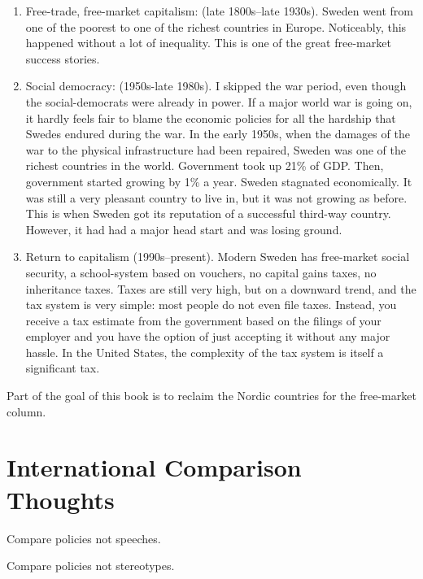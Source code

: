 \begin{enumerate}
\item Free-trade, free-market capitalism: (late 1800s--late 1930s). Sweden went
from one of the poorest to one of the richest countries in Europe. Noticeably,
this happened without a lot of inequality. This is one of the great free-market
success stories.
\item Social democracy: (1950s-late 1980s). I skipped the war period, even
though the social-democrats were already in power. If a major world war is
going on, it hardly feels fair to blame the economic policies for all the
hardship that Swedes endured during the war. In the early 1950s, when the
damages of the war to the physical infrastructure had been repaired, Sweden was
one of the richest countries in the world. Government took up 21\% of GDP.
Then, government started growing by 1\% a year. Sweden stagnated economically.
It was still a very pleasant country to live in,  but it was not growing as
before. This is when Sweden got its reputation of a successful third-way
country. However, it had had a major head start and was losing ground.
\item Return to capitalism (1990s--present). Modern Sweden has free-market
social security, a school-system based on vouchers, no capital gains taxes, no
inheritance taxes. Taxes are still very high, but on a downward trend, and the
tax system is very simple: most people do not even file taxes. Instead, you
receive a tax estimate from the government based on the filings of your
employer and you have the option of just accepting it without any major hassle.
In the United States, the complexity of the tax system is itself a significant
tax.
\end{enumerate}

Part of the goal of this book is to reclaim the Nordic countries for the
free-market column.

\section{International Comparison Thoughts}

\thought Compare policies not speeches.

\thought Compare policies not stereotypes.

